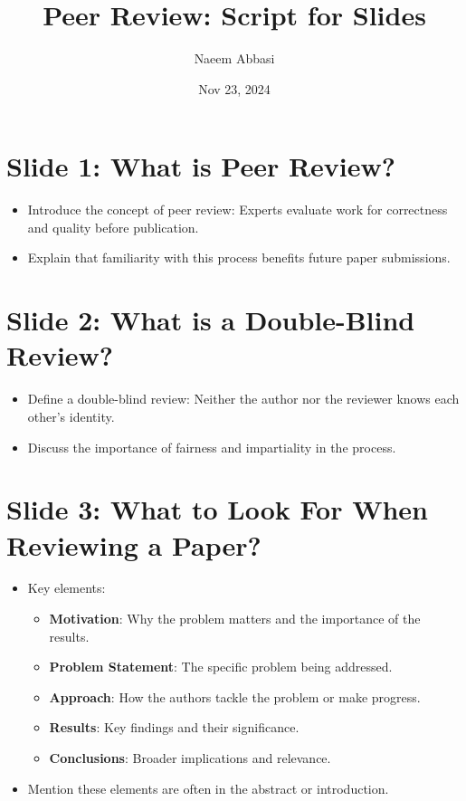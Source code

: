 \documentclass{article}
\title{Peer Review: Script for Slides}
\author{Naeem Abbasi}
\date{Nov 23, 2024}
\begin{document}
\maketitle

\section*{Slide 1: What is Peer Review?}
\begin{itemize}
    \item Introduce the concept of peer review: Experts evaluate work for correctness and quality before publication.
    \item Explain that familiarity with this process benefits future paper submissions.
\end{itemize}

\section*{Slide 2: What is a Double-Blind Review?}
\begin{itemize}
    \item Define a double-blind review: Neither the author nor the reviewer knows each other's identity.
    \item Discuss the importance of fairness and impartiality in the process.
\end{itemize}

\section*{Slide 3: What to Look For When Reviewing a Paper?}
\begin{itemize}
    \item Key elements:
        \begin{itemize}
            \item \textbf{Motivation}: Why the problem matters and the importance of the results.
            \item \textbf{Problem Statement}: The specific problem being addressed.
            \item \textbf{Approach}: How the authors tackle the problem or make progress.
            \item \textbf{Results}: Key findings and their significance.
            \item \textbf{Conclusions}: Broader implications and relevance.
        \end{itemize}
    \item Mention these elements are often in the abstract or introduction.
\end{itemize}
\end{document}
